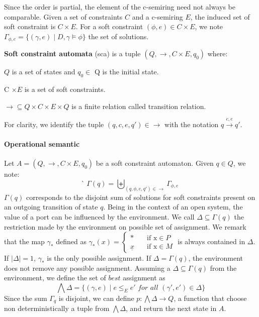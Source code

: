 Since the order is partial, the element of the c-semiring need not always be comparable. 
Given a set of constraints $C$ and a c-semiring $E$, the induced set of soft constraint is $C\times E$. For a soft constraint $(\phi,e) \in C \times E$, we note $\Gamma_{\phi,e} = \{ (\gamma,e) \mid D,\gamma \models \phi \}$ the set of solutions.

\begin{definition}
	\textbf{Soft constraint automata} (sca) is a tuple $(Q, \rightarrow, C \times E, q_{0} )$ where: 
	\begin{list}{-}{ }
		\item $Q$ is a set of states and $q_0\in$ Q is the initial state.
		\item C $\times E$ is a set of soft constraints.
		\item $\rightarrow \subseteq Q \times C \times E \times Q$ is a finite relation called transition relation. 
	\end{list}
\end{definition}
For clarity, we identify the tuple $(q,c,e,q') \in \rightarrow$ with the notation $q \xrightarrow{c,e} q'$.
\paragraph{Operational semantic}
Let $A = (Q, \rightarrow, C \times E, q_{0} )$ be a soft constraint automaton. Given $q\in Q$, we note:
 $$̀\Gamma(q) = \biguplus_{(q,\phi,e,q') \in \rightarrow}\Gamma_{\phi,e} $$
$\Gamma(q)$ corresponds to the disjoint sum of solutions for soft constraints present on an outgoing transition of state $q$. Being in the context of an open system, the value of a port can be influenced by the environment. We call $\Delta \subseteq \Gamma(q) $ the restriction made by the environment on possible set of assignment. We remark that the map $\gamma_*$ defined as $ \gamma_*(x) = 
\begin{cases}
	* &\quad\text{if x}\in P \\ 
	\underline{x} &\quad\text{if x} \in M  
\end{cases}$
 is always contained in $\Delta$. If $|\Delta|=1$, $\gamma_*$ is the only possible assignment. If $\Delta = \Gamma(q)$, the environment does not remove any possible assignment. Assuming a $\Delta \subseteq \Gamma(q)$ from the environment, we define the set of $best$ assignment as $$\bigwedge\Delta= \{(\gamma, e) \mid e \leq_E e' \textit{ for all } (\gamma',e')\in \Delta \}$$ Since the sum $\Gamma_q$ is disjoint, we can define $p : \bigwedge\Delta \rightarrow Q$, a function that choose non deterministically a tuple from $\bigwedge\Delta$, and return the next state in $A$.

